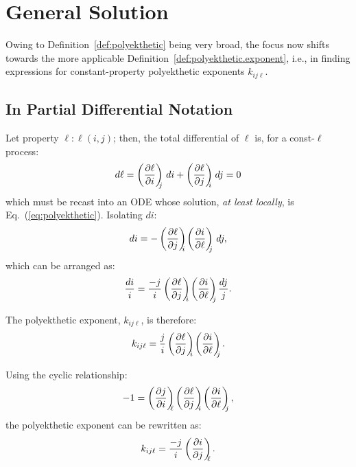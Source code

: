 \section{General Solution}

    Owing to Definition~\ref{def:polyekthetic} being very broad, the focus  now  shifts  towards
    the more applicable Definition~\ref{def:polyekthetic.exponent}, i.e., in finding expressions
    for constant-property polyekthetic exponents $k_{ij\ell}$.

    \subsection{In Partial Differential Notation}

    Let property $\ell\!:\!\ell(i, j)$; then,  the  total  differential  of  $\ell$  is,  for  a
    const-$\ell$ process:
    \begin{equation}
        d\ell = \left(\frac{\partial {{\ell}}}{\partial {{i}}}\right)_{\!\!\!{j}}\,di + \left(\frac{\partial {{\ell}}}{\partial {{j}}}\right)_{\!\!\!{i}}\,dj = 0
        \label{eq:polyek.dl}
    \end{equation}
    \noindent which must be recast into an ODE  whose  solution,  \emph{at  least  locally},  is
    Eq.~(\ref{eq:polyekthetic}). Isolating $di$:
    \begin{equation}
        di = -\left(\frac{\partial {{\ell}}}{\partial {{j}}}\right)_{\!\!\!{i}} \left(\frac{\partial {{i}}}{\partial {{\ell}}}\right)_{\!\!\!{j}}\,dj,
        \label{eq:polyek.di}
    \end{equation}
    \noindent which can be arranged as:
    \begin{equation}
        \frac{di}{i} = \frac{-j}{i} \left(\frac{\partial {{\ell}}}{\partial {{j}}}\right)_{\!\!\!{i}} \left(\frac{\partial {{i}}}{\partial {{\ell}}}\right)_{\!\!\!{j}} \frac{dj}{j}.
        \label{eq:polyek.ode}
    \end{equation}

    The polyekthetic exponent, $k_{ij\ell}$, is therefore:
    \begin{equation}
        k_{ij\ell} = \frac{j}{i} \left(\frac{\partial {{\ell}}}{\partial {{j}}}\right)_{\!\!\!{i}} \left(\frac{\partial {{i}}}{\partial {{\ell}}}\right)_{\!\!\!{j}}.
        \label{eq:polyek.k.raw}
    \end{equation}

    Using the cyclic relationship:
    \begin{equation}
        -1 = \parxyz ji\ell \parxyz\ell ji \parxyz i\ell j,
        \label{eq:cyclic}
    \end{equation}
    \noindent the polyekthetic exponent can be rewritten as:
    \begin{equation}
        k_{ij\ell} = \frac{-j}{i} \left(\frac{\partial {{i}}}{\partial {{j}}}\right)_{\!\!\!{\ell}}.
        \label{eq:polyek.k}
    \end{equation}

